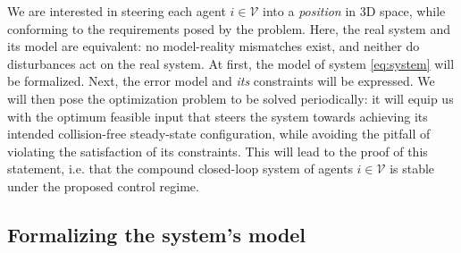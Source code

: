We are interested in steering each agent $i \in \mathcal{V}$ into
a \textit{position} in 3D space, while conforming to the requirements
posed by the problem. Here, the real system and its model are equivalent:
no model-reality mismatches exist, and neither do disturbances act on the real
system. At first, the model of system \eqref{eq:system} will be formalized.
Next, the error model and \textit{its} constraints will be expressed. We will
then pose the optimization problem to be solved periodically: it will equip us
with the optimum feasible input that steers the system towards achieving
its intended collision-free steady-state configuration, while avoiding the
pitfall of violating the satisfaction of its constraints. This will lead to
the proof of this statement, i.e. that the compound closed-loop system of
agents $i \in \mathcal{V}$ is stable under the proposed control regime.


\subsection{Formalizing the system's model}

